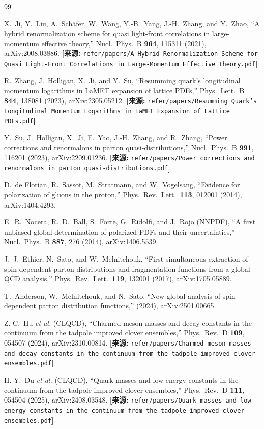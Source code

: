 \documentclass[12pt,a4paper]{ctexart}
\theoremstyle{definition}
\begin{document}
\begin{thebibliography}{99}

X.~Ji, Y.~Liu, A.~Sch\"afer, W.~Wang, Y.-B.~Yang, J.-H.~Zhang, and Y.~Zhao,
``A hybrid renormalization scheme for quasi light-front correlations in large-momentum effective theory,''
Nucl.\ Phys.\ B \textbf{964}, 115311 (2021), arXiv:2008.03886.
\quad\textbf{[来源:} \texttt{refer/papers/A Hybrid Renormalization Scheme for Quasi Light-Front Correlations in Large-Momentum Effective Theory.pdf}\textbf{]}

R.~Zhang, J.~Holligan, X.~Ji, and Y.~Su,
``Resumming quark's longitudinal momentum logarithms in LaMET expansion of lattice PDFs,''
Phys.\ Lett.\ B \textbf{844}, 138081 (2023), arXiv:2305.05212.
\quad\textbf{[来源:} \texttt{refer/papers/Resumming Quark's Longitudinal Momentum Logarithms in LaMET Expansion of Lattice PDFs.pdf}\textbf{]}

Y.~Su, J.~Holligan, X.~Ji, F.~Yao, J.-H.~Zhang, and R.~Zhang,
``Power corrections and renormalons in parton quasi-distributions,''
Nucl.\ Phys.\ B \textbf{991}, 116201 (2023), arXiv:2209.01236.
\quad\textbf{[来源:} \texttt{refer/papers/Power corrections and renormalons in parton quasi-distributions.pdf}\textbf{]}


D.~de Florian, R.~Sassot, M.~Stratmann, and W.~Vogelsang,
``Evidence for polarization of gluons in the proton,''
Phys.\ Rev.\ Lett.\ \textbf{113}, 012001 (2014), arXiv:1404.4293.

E.~R.~Nocera, R.~D.~Ball, S.~Forte, G.~Ridolfi, and J.~Rojo (NNPDF),
``A first unbiased global determination of polarized PDFs and their uncertainties,''
Nucl.\ Phys.\ B \textbf{887}, 276 (2014), arXiv:1406.5539.

J.~J.~Ethier, N.~Sato, and W.~Melnitchouk,
``First simultaneous extraction of spin-dependent parton distributions and fragmentation functions from a global QCD analysis,''
Phys.\ Rev.\ Lett.\ \textbf{119}, 132001 (2017), arXiv:1705.05889.

T.~Anderson, W.~Melnitchouk, and N.~Sato,
``New global analysis of spin-dependent parton distribution functions,''
(2024), arXiv:2501.00665.


Z.-C.~Hu \textit{et al.} (CLQCD),
``Charmed meson masses and decay constants in the continuum from the tadpole improved clover ensembles,''
Phys.\ Rev.\ D \textbf{109}, 054507 (2024), arXiv:2310.00814.
\quad\textbf{[来源:} \texttt{refer/papers/Charmed meson masses and decay constants in the continuum from the tadpole improved clover ensembles.pdf}\textbf{]}

H.-Y.~Du \textit{et al.} (CLQCD),
``Quark masses and low energy constants in the continuum from the tadpole improved clover ensembles,''
Phys.\ Rev.\ D \textbf{111}, 054504 (2025), arXiv:2408.03548.
\quad\textbf{[来源:} \texttt{refer/papers/Quark masses and low energy constants in the continuum from the tadpole improved clover ensembles.pdf}\textbf{]}

\end{thebibliography}
\end{document}
